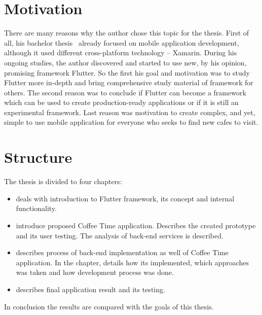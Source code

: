 \begin{introduction}
\section{Motivation}
There are many reasons why the author chose this topic for the thesis. First of all, his bachelor thesis~\cite{nymsap-bp} already focused on mobile application development, although it used different cross-platform technology -- Xamarin. During his ongoing studies, the author discovered and started to use new, by his opinion, promising framework Flutter. So the first his goal and motivation was to study Flutter more in-depth and bring comprehensive study material of framework for others. The second reason was to conclude if Flutter can become a framework which can be used to create production-ready applications or if it is still an experimental framework. Last reason was motivation to create complex, and yet, simple to use mobile application for everyone who seeks to find new cafes to visit.

\section{Structure}
The thesis is divided to four chapters:
\begin{itemize}
\item {} deals with introduction to Flutter framework, its concept and internal functionality.
\item {} introduce proposed Coffee Time application. Describes the created prototype and its user testing. The analysis of back-end services is described. 
\item {} describes process of back-end implementation as well of Coffee Time application. In the chapter, details how its implemented, which approaches was taken and how development process was done. 
\item {} describes final application result and its testing. 
\end{itemize}
In conclusion the results are compared with the goals of this thesis. 
\end{introduction}